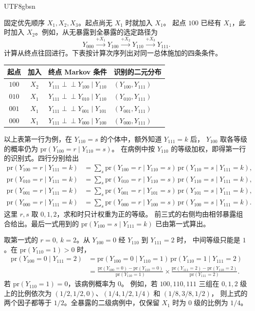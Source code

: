\documentclass[11pt,a4paper]{article}
\newcommand{\headingweight}{\ifPDFTeX\mdseries\else\bfseries\fi}
\newcommand{\indep}{\mathrel{\perp\!\!\!\perp}}
\theoremstyle{report}
\newcommand{\pr}{\mathrm{pr}}
\begin{document}
\begin{CJK*}{UTF8}{gbsn}
\clearpage
\noindent{\large\headingweight 三个暴露的四条终点 Markov 条件}\par
固定优先顺序 $X_1,X_2,X_3$。起点尚无 $X_1$ 时就加入 $X_1$。
起点 $100$ 已经有 $X_1$，此时加入 $X_2$。例如，从无暴露到全暴露的选定路径为
\[
Y_{000}\xrightarrow{+X_1}Y_{100}\xrightarrow{+X_2}Y_{110}\xrightarrow{+X_3}Y_{111}.
\]
计算从终点往回进行。下表按计算次序列出对同一总体施加的四条条件。
\begin{center}
\renewcommand{\arraystretch}{1.20}
\setlength{\tabcolsep}{7pt}
\begin{tabular}{@{}cccl@{}}
\toprule
起点 & 加入 & 终点 Markov 条件 & 识别的二元分布\\
\midrule
$100$ & $X_2$ & $Y_{111}\indep Y_{100}\mid Y_{110}$ & $(Y_{100},Y_{111})$\\
$010$ & $X_1$ & $Y_{111}\indep Y_{010}\mid Y_{110}$ & $(Y_{010},Y_{111})$\\
$001$ & $X_1$ & $Y_{111}\indep Y_{001}\mid Y_{101}$ & $(Y_{001},Y_{111})$\\
\addlinespace[2pt]
$000$ & $X_1$ & $Y_{111}\indep Y_{000}\mid Y_{100}$ & $(Y_{000},Y_{111})$\\
\bottomrule
\end{tabular}
\end{center}

以上表第一行为例，在 $Y_{110}=s$ 的个体中，额外知道 $Y_{111}=k$ 后，
$Y_{100}$ 取各等级的概率仍为 $\pr(Y_{100}=r\mid Y_{110}=s)$。
在病例中按 $Y_{110}$ 的等级加权，即得第一行的识别式。四行分别给出
\[
\begin{aligned}
\pr(Y_{100}=r\mid Y_{111}=k)
 &=\sum_s \pr(Y_{100}=r\mid Y_{110}=s)\,\pr(Y_{110}=s\mid Y_{111}=k),\\
\pr(Y_{010}=r\mid Y_{111}=k)
 &=\sum_s \pr(Y_{010}=r\mid Y_{110}=s)\,\pr(Y_{110}=s\mid Y_{111}=k),\\
\pr(Y_{001}=r\mid Y_{111}=k)
 &=\sum_s \pr(Y_{001}=r\mid Y_{101}=s)\,\pr(Y_{101}=s\mid Y_{111}=k),\\
\pr(Y_{000}=r\mid Y_{111}=k)
 &=\sum_s \pr(Y_{000}=r\mid Y_{100}=s)\,\pr(Y_{100}=s\mid Y_{111}=k).
\end{aligned}
\]
这里 $r,s$ 取 $0,1,2$，求和时只计权重为正的等级。
前三式的右侧均由相邻暴露组合给出。最后一式用到的
$\pr(Y_{100}=s\mid Y_{111}=k)$ 已由第一式算出。

取第一式的 $r=0,\ k=2$。从 $Y_{100}=0$ 经 $Y_{110}$ 到 $Y_{111}=2$ 时，
中间等级只能是 $1$。在 $\pr(Y_{110}=1)>0$ 时，
\[
\begin{aligned}
\pr(Y_{100}=0\mid Y_{111}=2)
 &=\pr(Y_{100}=0\mid Y_{110}=1)\,\pr(Y_{110}=1\mid Y_{111}=2)\\
 &=\frac{\pr(Y_{100}=0)-\pr(Y_{110}=0)}{\pr(Y_{110}=1)}
   \times\frac{\pr(Y_{111}=2)-\pr(Y_{110}=2)}{\pr(Y_{111}=2)}.
\end{aligned}
\]
若 $\pr(Y_{110}=1)=0$，该病例概率为 $0$。
例如，若 $100,110,111$ 三组在 $0,1,2$ 级上的比例依次为
$(1/2,1/2,0)$、$(1/4,1/2,1/4)$ 和 $(1/8,3/8,1/2)$，
则上式的两个因子都等于 $1/2$。全暴露的二级病例中，仅保留 $X_1$ 时为 $0$ 级的比例为 $1/4$。


\end{CJK*}
\end{document}
